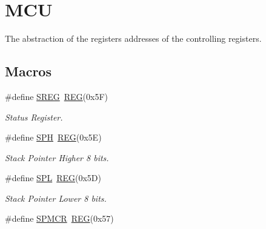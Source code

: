 \hypertarget{group__MCUMCAL}{\section{M\+C\+U}
\label{group__MCUMCAL}
}


The abstraction of the registers addresses of the controlling registers.  


\subsection*{Macros}
\begin{DoxyCompactItemize}
\item 
\hypertarget{group__MCUMCAL_ga9176fa6a3b810fc99cb2247a0cfeda91}{\#define \hyperlink{group__MCUMCAL_ga9176fa6a3b810fc99cb2247a0cfeda91}{S\+R\+E\+G}~\hyperlink{group__MCAL_ga72e45020e46f285689db51c46f273403}{R\+E\+G}(0x5\+F)}\label{group__MCUMCAL_ga9176fa6a3b810fc99cb2247a0cfeda91}

\begin{DoxyCompactList}\small\item\em Status Register. \end{DoxyCompactList}\item 
\hypertarget{group__MCUMCAL_ga5797932c0d118b1f01cf368c8c39466e}{\#define \hyperlink{group__MCUMCAL_ga5797932c0d118b1f01cf368c8c39466e}{S\+P\+H}~\hyperlink{group__MCAL_ga72e45020e46f285689db51c46f273403}{R\+E\+G}(0x5\+E)}\label{group__MCUMCAL_ga5797932c0d118b1f01cf368c8c39466e}

\begin{DoxyCompactList}\small\item\em Stack Pointer Higher 8 bits. \end{DoxyCompactList}\item 
\hypertarget{group__MCUMCAL_ga89e9165d11c61b79e4ed26fa174636f2}{\#define \hyperlink{group__MCUMCAL_ga89e9165d11c61b79e4ed26fa174636f2}{S\+P\+L}~\hyperlink{group__MCAL_ga72e45020e46f285689db51c46f273403}{R\+E\+G}(0x5\+D)}\label{group__MCUMCAL_ga89e9165d11c61b79e4ed26fa174636f2}

\begin{DoxyCompactList}\small\item\em Stack Pointer Lower 8 bits. \end{DoxyCompactList}\item 
\hypertarget{group__MCUMCAL_ga326a7e1f1306b5d4455d2c5d187fe8ba}{\#define \hyperlink{group__MCUMCAL_ga326a7e1f1306b5d4455d2c5d187fe8ba}{S\+P\+M\+C\+R}~\hyperlink{group__MCAL_ga72e45020e46f285689db51c46f273403}{R\+E\+G}(0x57)}\label{group__MCUMCAL_ga326a7e1f1306b5d4455d2c5d187fe8ba}


\end{DoxyCompactItemize}
